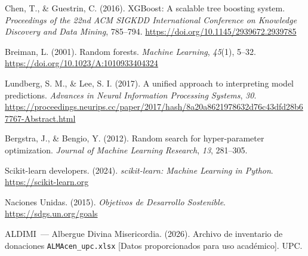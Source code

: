 \documentclass[12pt, a4paper]{article}
\begin{document}
\begin{enumerate}[leftmargin=2em, itemsep=5pt, label={[\arabic*]}]

  \item Chen, T., \& Guestrin, C. (2016).
    XGBoost: A scalable tree boosting system.
    \textit{Proceedings of the 22nd ACM SIGKDD International Conference on Knowledge Discovery and Data Mining}, 785--794.
    \url{https://doi.org/10.1145/2939672.2939785}

  \item Breiman, L. (2001).
    Random forests.
    \textit{Machine Learning}, \textit{45}(1), 5--32.
    \url{https://doi.org/10.1023/A:1010933404324}

  \item Lundberg, S. M., \& Lee, S. I. (2017).
    A unified approach to interpreting model predictions.
    \textit{Advances in Neural Information Processing Systems}, \textit{30}.
    \url{https://proceedings.neurips.cc/paper/2017/hash/8a20a8621978632d76c43dfd28b67767-Abstract.html}

  \item Bergstra, J., \& Bengio, Y. (2012).
    Random search for hyper-parameter optimization.
    \textit{Journal of Machine Learning Research}, \textit{13}, 281--305.

  \item Scikit-learn developers. (2024).
    \textit{scikit-learn: Machine Learning in Python}.
    \url{https://scikit-learn.org}

  \item Naciones Unidas. (2015).
    \textit{Objetivos de Desarrollo Sostenible}.
    \url{https://sdgs.un.org/goals}

  \item ALDIMI\ --- Albergue Divina Misericordia. (2026).
    Archivo de inventario de donaciones \texttt{ALMAcen\_upc.xlsx}
    [Datos proporcionados para uso acad\'emico]. UPC.

\end{enumerate}
\end{document}
